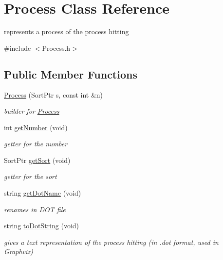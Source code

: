 \hypertarget{class_process}{\section{\-Process \-Class \-Reference}
\label{class_process}
}


represents a process of the process hitting  




{\ttfamily \#include $<$\-Process.\-h$>$}

\subsection*{\-Public \-Member \-Functions}
\begin{DoxyCompactItemize}
\item 
\hyperlink{class_process_a267617e8f2cfd994e0527635372be90c}{\-Process} (\-Sort\-Ptr s, const int \&n)
\begin{DoxyCompactList}\small\item\em builder for \hyperlink{class_process}{\-Process} \end{DoxyCompactList}\item 
\hypertarget{class_process_acdfa357f41df6f1e09cdffbc5c5b2c3b}{int \hyperlink{class_process_acdfa357f41df6f1e09cdffbc5c5b2c3b}{get\-Number} (void)}\label{class_process_acdfa357f41df6f1e09cdffbc5c5b2c3b}

\begin{DoxyCompactList}\small\item\em getter for the number \end{DoxyCompactList}\item 
\hypertarget{class_process_aaabe803350e1d6dcc23d8aa4ff2314db}{\-Sort\-Ptr \hyperlink{class_process_aaabe803350e1d6dcc23d8aa4ff2314db}{get\-Sort} (void)}\label{class_process_aaabe803350e1d6dcc23d8aa4ff2314db}

\begin{DoxyCompactList}\small\item\em getter for the sort \end{DoxyCompactList}\item 
string \hyperlink{class_process_af9a89e83db6a14451104b49eac7dd313}{get\-Dot\-Name} (void)
\begin{DoxyCompactList}\small\item\em renames in \-D\-O\-T file \end{DoxyCompactList}\item 
string \hyperlink{class_process_ad9c1f2be57856c4e62d00f8494d2281f}{to\-Dot\-String} (void)
\begin{DoxyCompactList}\small\item\em gives a text representation of the process hitting (in .dot format, used in \-Graphviz) \end{DoxyCompactList}\end{DoxyCompactItemize}


